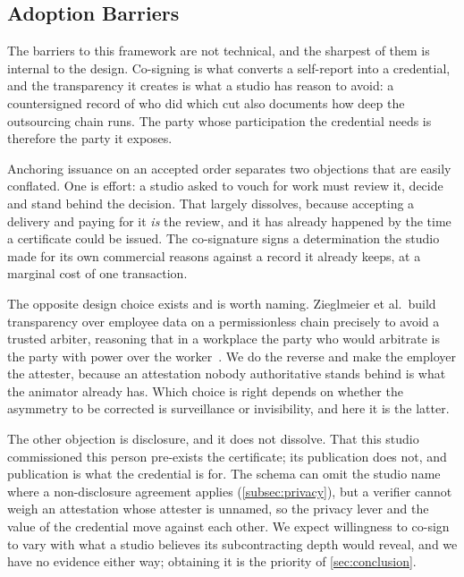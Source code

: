 
\subsection{Adoption Barriers}
\label{subsec:adoption_barriers}

The barriers to this framework are not technical, and the sharpest of them is
internal to the design. Co-signing is what converts a self-report into a
credential, and the transparency it creates is what a studio has reason to avoid:
a countersigned record of who did which cut also documents how deep the
outsourcing chain runs. The party whose participation the credential needs is
therefore the party it exposes.

Anchoring issuance on an accepted order separates two objections that are easily
conflated. One is effort: a studio asked to vouch for work must review it, decide and
stand behind the decision. That largely dissolves, because accepting a delivery and
paying for it \emph{is} the review, and it has already happened by the time a
certificate could be issued. The co-signature signs a determination the studio made for
its own commercial reasons against a record it already keeps, at a marginal cost of one
transaction.

The opposite design choice exists and is worth naming. Zieglmeier et al.\ build
transparency over employee data on a permissionless chain precisely to avoid a
trusted arbiter, reasoning that in a workplace the party who would arbitrate is the
party with power over the worker~\cite{zieglmeier2023inverse}. We do the reverse and
make the employer the attester, because an attestation nobody authoritative stands
behind is what the animator already has. Which choice is right depends on whether the
asymmetry to be corrected is surveillance or invisibility, and here it is the latter.

The other objection is disclosure, and it does not dissolve. That this studio
commissioned this person pre-exists the certificate; its publication does not, and
publication is what the credential is for. The schema can omit the studio name where a
non-disclosure agreement applies (\cref{subsec:privacy}), but a verifier cannot weigh an
attestation whose attester is unnamed, so the privacy lever and the value of the
credential move against each other. We expect willingness to co-sign to vary with what a
studio believes its subcontracting depth would reveal, and we have no evidence either
way; obtaining it is the priority of \cref{sec:conclusion}.

